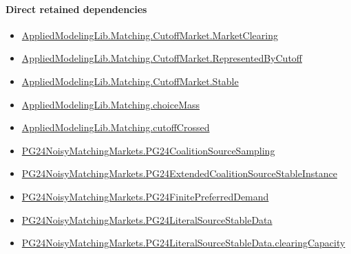 \documentclass[10pt]{article}
\begin{document}
\paragraph{Direct retained dependencies}
\begin{itemize}\raggedright
\item \hyperlink{governing-declaration-e5b9ae646f41eb33}{Applied\allowbreak{}Modeling\allowbreak{}Lib.\allowbreak{}Matching.\allowbreak{}Cutoff\allowbreak{}Market.\allowbreak{}Market\allowbreak{}Clearing}
\item \hyperlink{governing-declaration-3dd3ecccc56daba3}{Applied\allowbreak{}Modeling\allowbreak{}Lib.\allowbreak{}Matching.\allowbreak{}Cutoff\allowbreak{}Market.\allowbreak{}Represented\allowbreak{}By\allowbreak{}Cutoff}
\item \hyperlink{governing-declaration-e3570f2884c32270}{Applied\allowbreak{}Modeling\allowbreak{}Lib.\allowbreak{}Matching.\allowbreak{}Cutoff\allowbreak{}Market.\allowbreak{}Stable}
\item \hyperlink{governing-declaration-c4399ab8f4a80edd}{Applied\allowbreak{}Modeling\allowbreak{}Lib.\allowbreak{}Matching.\allowbreak{}choice\allowbreak{}Mass}
\item \hyperlink{governing-declaration-6c4148fab36718bc}{Applied\allowbreak{}Modeling\allowbreak{}Lib.\allowbreak{}Matching.\allowbreak{}cutoff\allowbreak{}Crossed}
\item \hyperlink{paper-prerequisite-ff3f13051cdbc914}{PG24\allowbreak{}Noisy\allowbreak{}Matching\allowbreak{}Markets.\allowbreak{}PG24\allowbreak{}Coalition\allowbreak{}Source\allowbreak{}Sampling}
\item \hyperlink{governing-declaration-bb079e77cf2d27e0}{PG24\allowbreak{}Noisy\allowbreak{}Matching\allowbreak{}Markets.\allowbreak{}PG24\allowbreak{}Extended\allowbreak{}Coalition\allowbreak{}Source\allowbreak{}Stable\allowbreak{}Instance}
\item \hyperlink{governing-declaration-5abddabcc3314102}{PG24\allowbreak{}Noisy\allowbreak{}Matching\allowbreak{}Markets.\allowbreak{}PG24\allowbreak{}Finite\allowbreak{}Preferred\allowbreak{}Demand}
\item \hyperlink{governing-declaration-c1ccb10f906ac674}{PG24\allowbreak{}Noisy\allowbreak{}Matching\allowbreak{}Markets.\allowbreak{}PG24\allowbreak{}Literal\allowbreak{}Source\allowbreak{}Stable\allowbreak{}Data}
\item \hyperlink{governing-declaration-f62257f667d25132}{PG24\allowbreak{}Noisy\allowbreak{}Matching\allowbreak{}Markets.\allowbreak{}PG24\allowbreak{}Literal\allowbreak{}Source\allowbreak{}Stable\allowbreak{}Data.\allowbreak{}clearing\allowbreak{}Capacity}

\end{itemize}
\end{document}
